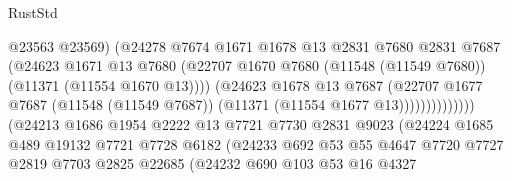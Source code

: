 \begin{lexlean}{RustStd}
\begin{coremodule}
                                          @23563
                                          @23569)
                                        (@24278
                                          @7674
                                          @1671
                                          @1678
                                          @13
                                          @2831
                                          @7680
                                          @2831
                                          @7687
                                          (@24623
                                            @1671
                                            @13
                                            @7680
                                            (@22707
                                              @1670
                                              @7680
                                              (@11548 (@11549 @7680))
                                              (@11371 (@11554 @1670 @13))))
                                          (@24623
                                            @1678
                                            @13
                                            @7687
                                            (@22707
                                              @1677
                                              @7687
                                              (@11548 (@11549 @7687))
                                              (@11371 (@11554 @1677 @13))))))))))))))
                      (@24213
                        @1686
                        @1954
                        @2222
                        @13
                        @7721
                        @7730
                        @2831
                        @9023
                        (@24224
                          @1685
                          @489
                          @19132
                          @7721
                          @7728
                          @6182
                          (@24233
                            @692
                            @53
                            @55
                            @4647
                            @7720
                            @7727
                            @2819
                            @7703
                            @2825
                            @22685
                            (@24232
                              @690
                              @103
                              @53
                              @16
                              @4327

\end{coremodule}
\end{lexlean}
